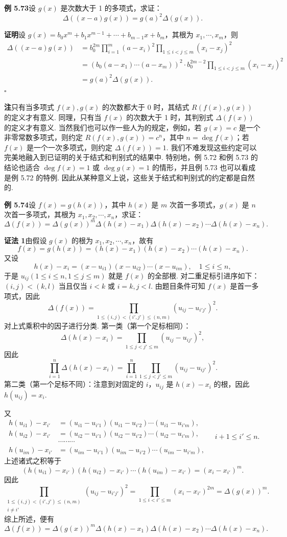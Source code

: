 \documentclass[UTF8, 12pt, fontset=fandol, oneside]{ctexart}
\begin{document}
\noindent\textbf{例 5.73}\quad 设 $g(x)$ 是次数大于 1 的多项式，求证：
\[
\Delta((x-a)g(x))=g(a)^2\Delta(g(x)).
\]

\noindent\textbf{证明}\quad 设 $g(x)=b_0x^m+b_1x^{m-1}+\cdots+b_{m-1}x+b_m$，其根为 $x_1,\cdots,x_m$，则
\[
\begin{aligned}
\Delta((x-a)g(x))
&=b_0^{2m}\prod_{i=1}^m(a-x_i)^2\prod_{1\le i<j\le m}(x_i-x_j)^2\\
&=\left(b_0(a-x_1)\cdots(a-x_m)\right)^2\cdot b_0^{2m-2}\prod_{1\le i<j\le m}(x_i-x_j)^2\\
&=g(a)^2\Delta(g(x)).
\end{aligned}
\]
\hfill $\square$

\noindent\textbf{注}\quad 只有当多项式 $f(x),g(x)$ 的次数都大于 0 时，其结式 $R(f(x),g(x))$ 的定义才有意义. 同理，只有当 $f(x)$ 的次数大于 1 时，其判别式 $\Delta(f(x))$ 的定义才有意义. 当然我们也可以作一些人为的规定，例如，若 $g(x)=c$ 是一个非零常数多项式，则约定 $R(f(x),g(x))=c^n$，其中 $n=\deg f(x)$；若 $f(x)$ 是一个一次多项式，则约定 $\Delta(f(x))=1$. 我们不难发现这些约定可以完美地融入到已证明的关于结式和判别式的结果中. 特别地，例 5.72 和例 5.73 的结论也适合 $\deg f(x)=1$ 或 $\deg g(x)=1$ 的情形，并且例 5.73 也可以看成是例 5.72 的特例. 因此从某种意义上说，这些关于结式和判别式的约定都是自然的.

\noindent\textbf{例 5.74}\quad 设 $f(x)=g(h(x))$，其中 $h(x)$ 是 $m$ 次首一多项式，$g(x)$ 是 $n$ 次首一多项式，其根为 $x_1,x_2,\cdots,x_n$，求证：
\[
\Delta(f(x))=\Delta(g(x))^m\Delta(h(x)-x_1)\Delta(h(x)-x_2)\cdots\Delta(h(x)-x_n).
\]

\noindent\textbf{证法 1}\quad 由假设 $g(x)$ 的根为 $x_1,x_2,\cdots,x_n$，故有
\[
f(x)=g(h(x))=(h(x)-x_1)(h(x)-x_2)\cdots(h(x)-x_n).
\]
又设
\[
h(x)-x_i=(x-u_{i1})(x-u_{i2})\cdots(x-u_{im}),\quad 1\le i\le n,
\]
于是 $u_{ij}(1\le i\le n,1\le j\le m)$ 就是 $f(x)$ 的全部根. 对二重足标引进序如下：$(i,j)<(k,l)$ 当且仅当 $i<k$ 或 $i=k,j<l$. 由题目条件可知 $f(x)$ 是首一多项式，因此
\[
\Delta(f(x))=\prod_{1\le(i,j)<(i',j')\le(n,m)}(u_{ij}-u_{i'j'})^2.
\]
对上式乘积中的因子进行分类. 第一类（第一个足标相同）：
\[
\Delta(h(x)-x_i)=\prod_{1\le j<j'\le m}(u_{ij}-u_{ij'})^2,
\]
因此
\[
\prod_{i=1}^n\Delta(h(x)-x_i)=\prod_{i=1}^n\prod_{1\le j<j'\le m}(u_{ij}-u_{ij'})^2.
\]
第二类（第一个足标不同）：注意到对固定的 $i$，$u_{ij}$ 是 $h(x)-x_i$ 的根，因此 $h(u_{ij})=x_i$.

又
\[
\begin{aligned}
h(u_{i1})-x_{i'}&=(u_{i1}-u_{i'1})(u_{i1}-u_{i'2})\cdots(u_{i1}-u_{i'm}),\\
h(u_{i2})-x_{i'}&=(u_{i2}-u_{i'1})(u_{i2}-u_{i'2})\cdots(u_{i2}-u_{i'm}),\\
&\cdots\cdots\cdots\\
h(u_{im})-x_{i'}&=(u_{im}-u_{i'1})(u_{im}-u_{i'2})\cdots(u_{im}-u_{i'm}),
\end{aligned}
\quad i+1\le i'\le n.
\]
上述诸式之积等于
\[
(h(u_{i1})-x_{i'})(h(u_{i2})-x_{i'})\cdots(h(u_{im})-x_{i'})
=(x_i-x_{i'})^m.
\]
因此
\[
\prod_{\substack{1\le(i,j)<(i',j')\le(n,m)\\ i\ne i'}}(u_{ij}-u_{i'j'})^2
=\prod_{1\le i<i'\le m}(x_i-x_{i'})^{2m}
=\Delta(g(x))^m.
\]
综上所述，便有
\[
\Delta(f(x))=\Delta(g(x))^m\Delta(h(x)-x_1)\Delta(h(x)-x_2)\cdots\Delta(h(x)-x_n).
\]
\end{document}
